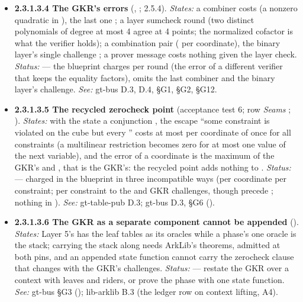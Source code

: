 \begin{itemize}[label={}, leftmargin=1.3em, itemindent=-1.3em, labelwidth=0pt, labelsep=0pt, itemsep=4pt, topsep=3pt]
\begin{itemize}[label={}, leftmargin=1.3em, itemindent=-1.3em, labelwidth=0pt, labelsep=0pt, itemsep=4pt, topsep=3pt]
\item {}\label{obl:node-2.3.1.3.4}\oblflag\textbf{2.3.1.3.4 The GKR's errors} (, ; 2.5.4). \emph{States:} a combiner costs  (a nonzero quadratic in ), the last one ; a layer sumcheck round  (two distinct polynomials of degree at most 4 agree at 4 points; the normalized cofactor is what the verifier holds); a combination pair  ( per coordinate), the binary layer's single challenge ; a prover message costs nothing given the layer check. \emph{Status:}   — the blueprint charges  per round (the error of a different verifier that keeps the equality factors), omits the last combiner and the binary layer's challenge. \emph{See:} gt-bus D.3, D.4, §G1, §G2, §G12.
\item {}\label{obl:node-2.3.1.3.5}\oblflag\textbf{2.3.1.3.5 The recycled zerocheck point} (acceptance test 6; row \emph{Seams} ; ). \emph{States:} with the state a conjunction , the escape ``some constraint is violated on the cube but every '' costs at most  per coordinate of  once for all constraints (a multilinear restriction becomes zero for at most one value of the next variable), and the error of a coordinate is the maximum of the GKR's and , that is the GKR's: the recycled point adds nothing to . \emph{Status:}   — charged in the blueprint in three incompatible ways (per coordinate per constraint;  per constraint to the  and GKR challenges, though  precede ; nothing in ). \emph{See:} gt-table-pub D.3; gt-bus D.3, §G6 ().
\item {}\label{obl:node-2.3.1.3.6}\oblflag\textbf{2.3.1.3.6 The GKR as a separate component cannot be appended} (). \emph{States:} Layer 5's  has the leaf tables as its oracles while a phase's one oracle is the stack; carrying the stack along needs ArkLib's  theorems, admitted at both pins, and an appended state function cannot carry the zerocheck clause that changes with the GKR's challenges. \emph{Status:}   — restate the GKR over a context with leaves and riders, or prove the phase with one state function. \emph{See:} gt-bus §G3 (); lib-arklib B.3 (the ledger row on context lifting, A4).

\end{itemize}
\end{itemize}
